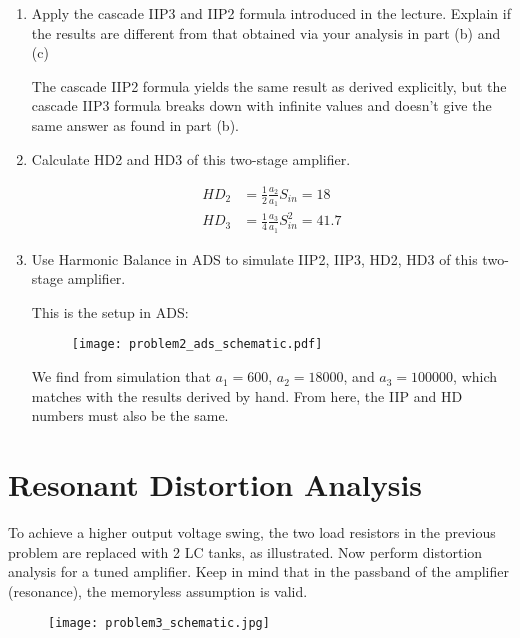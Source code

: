 \begin{enumerate}[label=(\alph*)]
    \item {\color{blue} Apply the cascade IIP3 and IIP2 formula introduced in the lecture. Explain if the results are different from that obtained via your analysis in part (b) and (c)}

    The cascade IIP2 formula yields the same result as derived explicitly, but the cascade IIP3 formula breaks down with infinite values and doesn't give the same answer as found in part (b).

    \item {\color{blue} Calculate HD2 and HD3 of this two-stage amplifier.}

    \begin{align*}
        HD_2 &= \frac{1}{2} \frac{a_2}{a_1} S_{in} = 18 \\
        HD_3 &= \frac{1}{4} \frac{a_3}{a_1} S_{in}^2 = 41.7
    \end{align*}

    \item {\color{blue} Use Harmonic Balance in ADS to simulate IIP2, IIP3, HD2, HD3 of this two-stage amplifier.}

    This is the setup in ADS:
    \begin{figure}[H]
        \centering \texttt{[image: problem2\_ads\_schematic.pdf]}
    \end{figure}

    We find from simulation that $a_1 = 600$, $a_2 = 18000$, and $a_3 = 100000$, which matches with the results derived by hand.
    From here, the IIP and HD numbers must also be the same.
\end{enumerate}

\section{Resonant Distortion Analysis}
{\color{blue} To achieve a higher output voltage swing, the two load resistors in the previous problem are replaced with 2 LC tanks, as illustrated.
Now perform distortion analysis for a tuned amplifier.
Keep in mind that in the passband of the amplifier (resonance), the memoryless assumption is valid.}
\begin{figure}[H]
    \centering \texttt{[image: problem3\_schematic.jpg]}
\end{figure}


